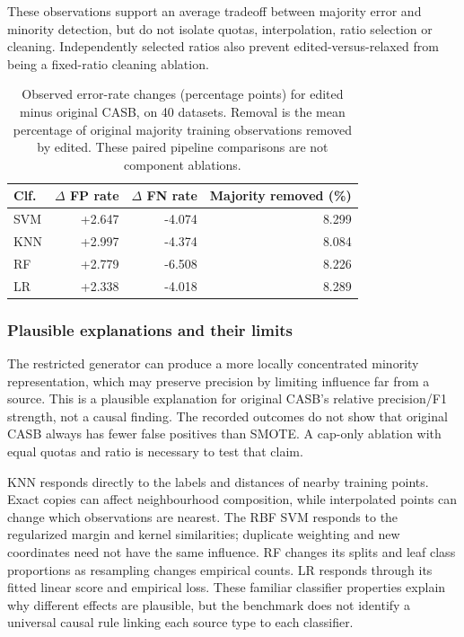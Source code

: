\documentclass[conference]{IEEEtran}
\begin{document}
These observations support an average tradeoff between majority error and minority detection, but do not isolate quotas, interpolation, ratio selection or cleaning. Independently selected ratios also prevent edited-versus-relaxed from being a fixed-ratio cleaning ablation.
\begin{table}[!t]
\centering\small
\caption{Observed error-rate changes (percentage points) for edited minus original CASB, on 40 datasets. Removal is the mean percentage of original majority training observations removed by edited. These paired pipeline comparisons are not component ablations.}\label{tab:mechanisms}
\begin{tabular}{lrrr}\toprule
Clf. & $\Delta$ FP rate & $\Delta$ FN rate & Majority removed (\%) \\
\midrule
SVM & +2.647 & -4.074 & 8.299 \\
KNN & +2.997 & -4.374 & 8.084 \\
RF & +2.779 & -6.508 & 8.226 \\
LR & +2.338 & -4.018 & 8.289 \\
\bottomrule\end{tabular}
\end{table}

\subsubsection{Plausible explanations and their limits}
The restricted generator can produce a more locally concentrated minority representation, which may preserve precision by limiting influence far from a source. This is a plausible explanation for original CASB's relative precision/F1 strength, not a causal finding. The recorded outcomes do not show that original CASB always has fewer false positives than SMOTE. A cap-only ablation with equal quotas and ratio is necessary to test that claim.

KNN responds directly to the labels and distances of nearby training points. Exact copies can affect neighbourhood composition, while interpolated points can change which observations are nearest. The RBF SVM responds to the regularized margin and kernel similarities; duplicate weighting and new coordinates need not have the same influence. RF changes its splits and leaf class proportions as resampling changes empirical counts. LR responds through its fitted linear score and empirical loss. These familiar classifier properties explain why different effects are plausible, but the benchmark does not identify a universal causal rule linking each source type to each classifier.
\end{document}

